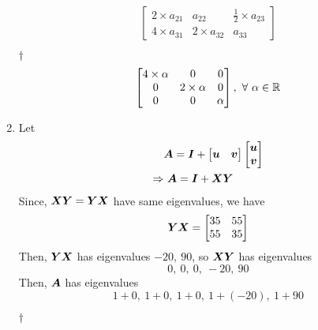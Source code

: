 \documentclass[a4paper,12pt]{article}
\begin{document}
\begin{enumerate}
\begin{equation}
\begin{bmatrix}
            2 \times a_{21} & a_{22} & \frac{1}{2} \times a_{23} \\
            4 \times a_{31} & 2 \times a_{32} & a_{33}
        \end{bmatrix}
    \end{equation}
    \begin{answer}{$\dag$}\begin{equation}
            \begin{bmatrix}
                4 \times \alpha & 0 & 0 \\
                0 & 2 \times \alpha & 0 \\
                0 & 0 & \alpha
            \end{bmatrix}, \ \forall \ \alpha \in \mathbb{R}
        \end{equation}
    \end{answer}
    \item Let \begin{equation}
        \begin{aligned}
            & \boldsymbol{A} = \boldsymbol{I} + \begin{bmatrix}
                \boldsymbol{u} & \boldsymbol{v}
            \end{bmatrix} \begin{bmatrix}
                \boldsymbol{u} \\
                \boldsymbol{v}
            \end{bmatrix} \\
            \Rightarrow & \ \boldsymbol{A} = \boldsymbol{I} + \boldsymbol{X}\boldsymbol{Y}
        \end{aligned}
    \end{equation} Since, $\boldsymbol{XY} = \boldsymbol{YX}$ have same eigenvalues, we have \begin{equation}
        \boldsymbol{YX} = \begin{bmatrix}
            35 & 55 \\
            55 & 35
        \end{bmatrix}
    \end{equation} Then, $\boldsymbol{YX}$ has eigenvalues $-20, \ 90$, so $\boldsymbol{XY}$ has eigenvalues \begin{equation}
        0, \ 0, \ 0, \ -20, \ 90
    \end{equation} Then, $\boldsymbol{A}$ has eigenvalues \begin{equation}
        1 + 0, \ 1 + 0, \ 1 + 0, \ 1 + (-20), \ 1 + 90
    \end{equation}
    \begin{answer}{$\dag$}\begin{equation}

\end{equation}
\end{answer}
\end{enumerate}
\end{document}
